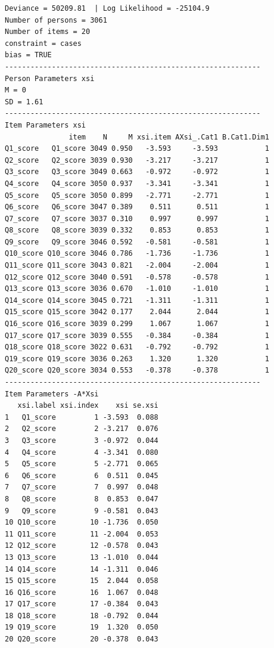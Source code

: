 \documentclass[
  letterpaper,
  DIV=11,
  numbers=noendperiod]{scrreprt}
\newenvironment{Shaded}{\begin{snugshade}}{\end{snugshade}}
\newcommand{\CommentTok}[1]{\textcolor[rgb]{0.37,0.37,0.37}{#1}}
\newcommand{\FunctionTok}[1]{\textcolor[rgb]{0.28,0.35,0.67}{#1}}
\newcommand{\NormalTok}[1]{\textcolor[rgb]{0.00,0.23,0.31}{#1}}
\newcommand{\SpecialCharTok}[1]{\textcolor[rgb]{0.37,0.37,0.37}{#1}}
\begin{document}
\begin{verbatim}
Deviance = 50209.81  | Log Likelihood = -25104.9 
Number of persons = 3061 
Number of items = 20 
constraint = cases 
bias = TRUE 
------------------------------------------------------------
Person Parameters xsi
M = 0 
SD = 1.61 
------------------------------------------------------------
Item Parameters xsi
               item    N     M xsi.item AXsi_.Cat1 B.Cat1.Dim1
Q1_score   Q1_score 3049 0.950   -3.593     -3.593           1
Q2_score   Q2_score 3039 0.930   -3.217     -3.217           1
Q3_score   Q3_score 3049 0.663   -0.972     -0.972           1
Q4_score   Q4_score 3050 0.937   -3.341     -3.341           1
Q5_score   Q5_score 3050 0.899   -2.771     -2.771           1
Q6_score   Q6_score 3047 0.389    0.511      0.511           1
Q7_score   Q7_score 3037 0.310    0.997      0.997           1
Q8_score   Q8_score 3039 0.332    0.853      0.853           1
Q9_score   Q9_score 3046 0.592   -0.581     -0.581           1
Q10_score Q10_score 3046 0.786   -1.736     -1.736           1
Q11_score Q11_score 3043 0.821   -2.004     -2.004           1
Q12_score Q12_score 3040 0.591   -0.578     -0.578           1
Q13_score Q13_score 3036 0.670   -1.010     -1.010           1
Q14_score Q14_score 3045 0.721   -1.311     -1.311           1
Q15_score Q15_score 3042 0.177    2.044      2.044           1
Q16_score Q16_score 3039 0.299    1.067      1.067           1
Q17_score Q17_score 3039 0.555   -0.384     -0.384           1
Q18_score Q18_score 3022 0.631   -0.792     -0.792           1
Q19_score Q19_score 3036 0.263    1.320      1.320           1
Q20_score Q20_score 3034 0.553   -0.378     -0.378           1
------------------------------------------------------------
Item Parameters -A*Xsi
   xsi.label xsi.index    xsi se.xsi
1   Q1_score         1 -3.593  0.088
2   Q2_score         2 -3.217  0.076
3   Q3_score         3 -0.972  0.044
4   Q4_score         4 -3.341  0.080
5   Q5_score         5 -2.771  0.065
6   Q6_score         6  0.511  0.045
7   Q7_score         7  0.997  0.048
8   Q8_score         8  0.853  0.047
9   Q9_score         9 -0.581  0.043
10 Q10_score        10 -1.736  0.050
11 Q11_score        11 -2.004  0.053
12 Q12_score        12 -0.578  0.043
13 Q13_score        13 -1.010  0.044
14 Q14_score        14 -1.311  0.046
15 Q15_score        15  2.044  0.058
16 Q16_score        16  1.067  0.048
17 Q17_score        17 -0.384  0.043
18 Q18_score        18 -0.792  0.044
19 Q19_score        19  1.320  0.050
20 Q20_score        20 -0.378  0.043
\end{verbatim}

\begin{Shaded}
\end{Shaded}
\end{document}
